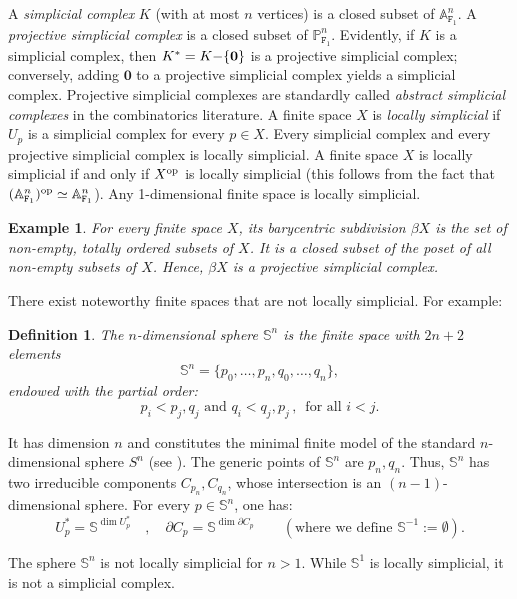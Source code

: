 \documentclass[amssymb,amscd,11pt,20pt]{amsart}
\newcommand{\FF}{{\mathtt F}}
\newcommand{\Sa}{{\mathbb S}}
\newcommand{\PP}{\mathbb P}
\newcommand{\0}{\mathbf 0}
\newcommand{\A}{{\mathbb A}}
\theoremstyle{plain}
\newtheorem{defn}[thm]{Definition}
\newtheorem*{ex}{Example}
\numberwithin{equation}{thm}
\begin{document}
 A {\em simplicial complex} $K$ (with at most $n$ vertices) is a closed subset of $\A^n_{\FF_1}$. A {\em projective simplicial complex} is a closed subset of $\PP^{n}_{\FF_1}$. Evidently, if $K$ is a simplicial complex, then $K^*=K\negmedspace - \negmedspace\{\0\}$ is a projective simplicial complex; conversely, adding $\0$ to a projective simplicial complex yields a simplicial complex. Projective simplicial complexes are standardly called \emph{abstract simplicial complexes} in the combinatorics literature.  A finite space $X$ is {\em locally simplicial} if $U_p$ is a simplicial complex for every $p\in X$. Every simplicial complex and every projective simplicial complex is locally simplicial. A finite space $X$ is locally simplicial if and only if $X^{\text{\rm op}}$ is locally simplicial (this follows from the fact that $(\A^n_{\FF_1})^{\text{\rm op}}\simeq \A^n_{\FF_1}$). Any 1-dimensional finite space is locally simplicial.  
 
 \begin{ex} {\rm For every finite space $X$, its {\em barycentric subdivision} $\beta X$ is the set of non-empty, totally ordered subsets of $X$. It is a closed subset of the poset of all non-empty subsets of $X$. Hence, $\beta X$ is a projective simplicial complex.}
\end{ex}
 
 There exist noteworthy finite spaces that are not locally simplicial. For example:

\begin{defn}\label{spheres}{\rm The {\em $n$-dimensional sphere} $\Sa^n$ is the finite space with $2n+2$ elements $$\Sa^n=\{p_0,\dots,p_n,q_0,\dots ,q_n\},$$ endowed with the partial order:
\[ p_i<p_j, q_j \text{ and } q_i < q_j,p_j \, ,\, \text{ for all } i<j.\]}\end{defn} It has dimension $n$ and constitutes  the minimal finite model of the standard
$n$-dimensional sphere $S^n$ (see \cite{Barmak}). The generic points of $\Sa^n$ are $p_n,q_n$. Thus, $\Sa^n$ has two irreducible components $C_{p_n},C_{q_n}$, whose intersection is an $(n-1)$-dimensional sphere. For every $p\in\Sa^n$, one has:
\[ U_p^*=\Sa^{\dim U_p^*}   \quad  , \quad \partial C_p=\Sa^{\dim \partial C_p}\qquad (\text{where we define }  \Sa^{-1}:=\emptyset).\]

The sphere $\Sa^n$ is not locally simplicial for $n>1$. While $\Sa^1$ is locally simplicial, it is not a simplicial complex.
\medskip

\end{document}
